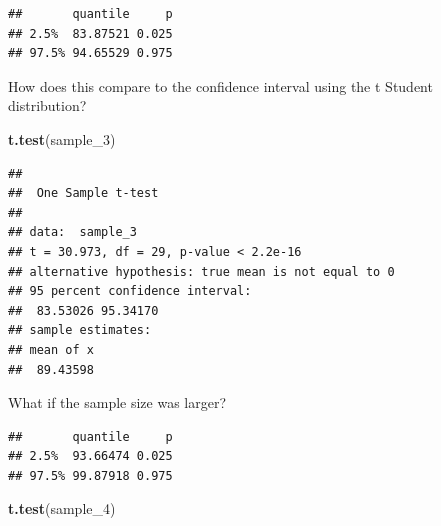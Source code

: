 \documentclass[]{book}
\newenvironment{Shaded}{\begin{snugshade}}{\end{snugshade}}
\newcommand{\DataTypeTok}[1]{\textcolor[rgb]{0.13,0.29,0.53}{#1}}
\newcommand{\DecValTok}[1]{\textcolor[rgb]{0.00,0.00,0.81}{#1}}
\newcommand{\FloatTok}[1]{\textcolor[rgb]{0.00,0.00,0.81}{#1}}
\newcommand{\KeywordTok}[1]{\textcolor[rgb]{0.13,0.29,0.53}{\textbf{#1}}}
\newcommand{\NormalTok}[1]{#1}
\newcommand{\OperatorTok}[1]{\textcolor[rgb]{0.81,0.36,0.00}{\textbf{#1}}}
\newcommand{\StringTok}[1]{\textcolor[rgb]{0.31,0.60,0.02}{#1}}
\theoremstyle{definition}
\theoremstyle{definition}
\theoremstyle{definition}
\theoremstyle{remark}
\begin{document}
\begin{verbatim}
##       quantile     p
## 2.5%  83.87521 0.025
## 97.5% 94.65529 0.975
\end{verbatim}

How does this compare to the confidence interval using the t Student
distribution?

\begin{Shaded}
\begin{Highlighting}[]
\KeywordTok{t.test}\NormalTok{(sample_}\DecValTok{3}\NormalTok{)}
\end{Highlighting}
\end{Shaded}

\begin{verbatim}
## 
##  One Sample t-test
## 
## data:  sample_3
## t = 30.973, df = 29, p-value < 2.2e-16
## alternative hypothesis: true mean is not equal to 0
## 95 percent confidence interval:
##  83.53026 95.34170
## sample estimates:
## mean of x 
##  89.43598
\end{verbatim}

What if the sample size was larger?

\begin{Shaded}
\end{Shaded}

\begin{verbatim}
##       quantile     p
## 2.5%  93.66474 0.025
## 97.5% 99.87918 0.975
\end{verbatim}

\begin{Shaded}
\begin{Highlighting}[]
\KeywordTok{t.test}\NormalTok{(sample_}\DecValTok{4}\NormalTok{)}
\end{Highlighting}
\end{Shaded}
\end{document}
